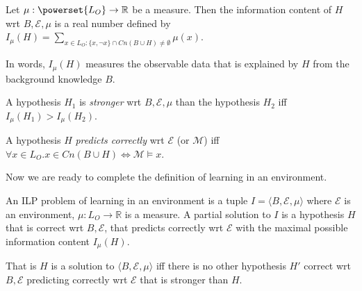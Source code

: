 \begin{defn}
Let $\mu:\powerset{L_O} \to \mathbb{R}$ be a measure.
Then the information content of $H$ wrt $B, \mathcal{E}, \mu$
is a real number defined by
$I_\mu(H)=\sum_{x \in L_O : \{x, \neg x\} \cap Cn(B \cup H) \not= \emptyset} \mu(x)$.
\end{defn}
In words, $I_\mu(H)$ measures the observable data that is explained by $H$ from the background knowledge $B$.

\begin{defn}
A hypothesis $H_1$ is \emph{stronger} wrt $B, \mathcal{E}, \mu$ than the hypothesis $H_2$
iff $I_\mu(H_1) > I_\mu(H_2)$.
\end{defn}

\begin{defn}
A hypothesis $H$ \emph{predicts correctly} wrt $\mathcal{E}$ (or $\mathcal{M}$) iff
$\forall x \in L_O. x \in Cn(B \cup H) \iff \mathcal{M} \models x$.
\end{defn}

Now we are ready to complete the definition of learning in an environment.
\begin{defn}
An ILP problem of learning in an environment is a tuple
$I=\langle B, \mathcal{E}, \mu \rangle$ where
$\mathcal{E}$ is an environment,
$\mu:L_O \to \mathbb{R}$ is a measure.
A partial solution to $I$
is a hypothesis $H$ that is correct wrt $B, \mathcal{E}$,
that predicts correctly wrt $\mathcal{E}$ with the maximal possible
information content $I_\mu(H)$.
\end{defn}
That is $H$ is a solution to $\langle B, \mathcal{E}, \mu \rangle$ iff there is no other hypothesis $H'$ correct wrt $B, \mathcal{E}$ predicting correctly wrt $\mathcal{E}$ that is stronger than $H$.

